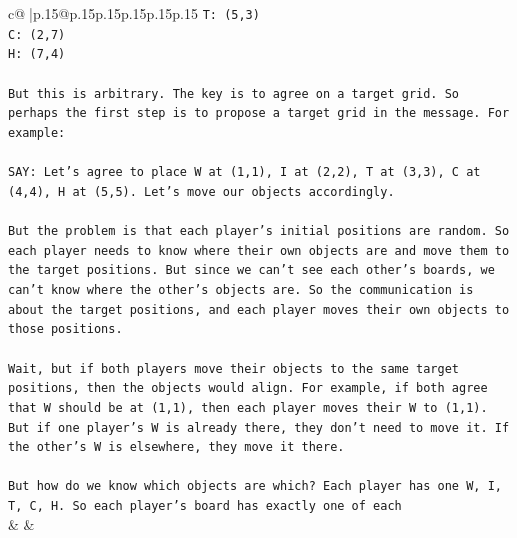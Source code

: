 \documentclass{article}
\begin{document}
{\begin{supertabular}{c@{$\;$}|p{.15\linewidth}@{}p{.15\linewidth}p{.15\linewidth}p{.15\linewidth}p{.15\linewidth}p{.15\linewidth}}
{{{\texttt{T: (5,3)} \\
\texttt{C: (2,7)} \\
\texttt{H: (7,4)} \\
\\ 
\texttt{But this is arbitrary. The key is to agree on a target grid. So perhaps the first step is to propose a target grid in the message. For example:} \\
\\ 
\texttt{SAY: Let's agree to place W at (1,1), I at (2,2), T at (3,3), C at (4,4), H at (5,5). Let's move our objects accordingly.} \\
\\ 
\texttt{But the problem is that each player's initial positions are random. So each player needs to know where their own objects are and move them to the target positions. But since we can't see each other's boards, we can't know where the other's objects are. So the communication is about the target positions, and each player moves their own objects to those positions.} \\
\\ 
\texttt{Wait, but if both players move their objects to the same target positions, then the objects would align. For example, if both agree that W should be at (1,1), then each player moves their W to (1,1). But if one player's W is already there, they don't need to move it. If the other's W is elsewhere, they move it there.} \\
\\ 
\texttt{But how do we know which objects are which? Each player has one W, I, T, C, H. So each player's board has exactly one of each} \\
            }
        }
    }
    & & \\ \\


\end{supertabular}}
\end{document}
